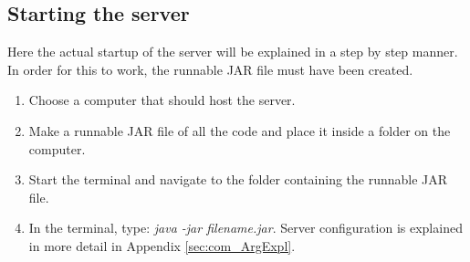 \subsection{Starting the server}
Here the actual startup of the server will be explained in a step by step manner.
In order for this to work, the runnable JAR file must have been created.
\begin{enumerate}
\item Choose a computer that should host the server.
\item Make a runnable JAR file of all the code and place it inside a folder on the computer.
\item Start the terminal and navigate to the folder containing the runnable JAR file.
\item In the terminal, type: \emph{java -jar filename.jar}. Server configuration is explained in more detail in Appendix \ref{sec:com_ArgExpl}.\\ 
\end{enumerate}
